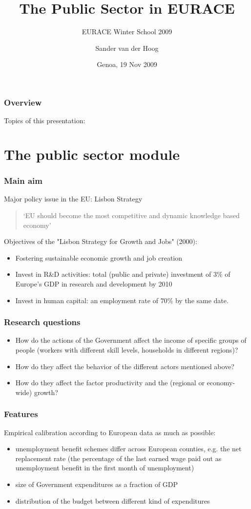 \documentclass{beamer}
\title{The Public Sector in EURACE}
\subtitle[EURACE WS '09]{EURACE Winter School 2009}
\author{Sander van der Hoog}
\date[Genoa '09]{Genoa, 19 Nov 2009}
\begin{document}
\frame{\titlepage}

\section[Overview]{}
\begin{frame}{}
\frametitle{Overview}
Topics of this presentation:
\tableofcontents
\end{frame}

\section{The public sector module}
\begin{frame}{}
\frametitle{Main aim}
Major policy issue in the EU: Lisbon Strategy
\begin{quote}
`EU should become the most competitive and dynamic knowledge based economy'
\end{quote}

\bigskip
Objectives of the "Lisbon Strategy for Growth and Jobs" (2000):
\begin{itemize}
\item Fostering sustainable economic growth and job creation
\item Invest in R\&D activities: total (public and private) investment of $3\%$ of Europe's GDP in research and development by 2010
\item Invest in human capital: an employment rate of $70\%$ by the same date.
\end{itemize}
\end{frame}

\begin{frame}{}
\frametitle{Research questions}
\begin{itemize}
\item How do the actions of the Government affect the income of specific
groups of people (workers with different skill levels, households in
different regions)?

\item How do they affect the behavior of the different actors mentioned
above?

\item How do they affect the factor productivity and the (regional or
economy-wide) growth?
\end{itemize}
\end{frame}

\begin{frame}{}
\frametitle{Features}
Empirical calibration according to European data as much as possible:
\begin{itemize}
\item unemployment benefit schemes differ across European counties, e.g. the net replacement rate (the percentage of the last
earned wage paid out as unemployment benefit in the first month of unemployment)
\item size of Government expenditures as a fraction of GDP
\item distribution of the budget between different kind of expenditures
\end{itemize}
\end{frame}
\end{document}
